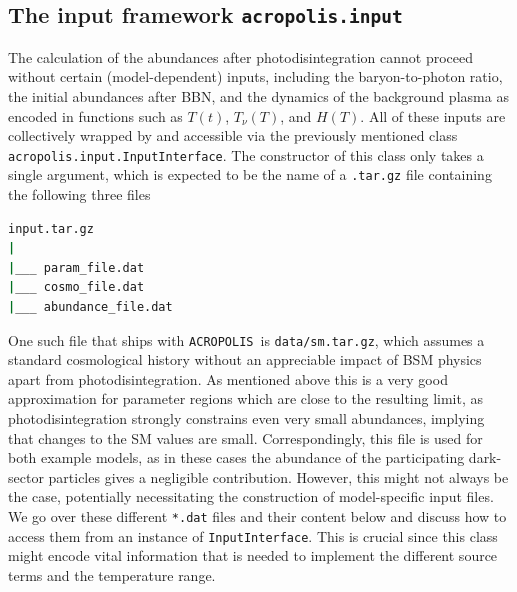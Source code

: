 \documentclass[11pt,a4paper]{article}
\newcommand{\acropolis}{\texttt{ACROPOLIS}~}
\begin{document}
\subsection{The input framework \texttt{acropolis.input}}
\label{sec:input}
The calculation of the abundances after photodisintegration cannot proceed without certain (model-dependent) inputs, including the baryon-to-photon ratio, the initial abundances after BBN, and the dynamics of the background plasma as encoded in functions such as $T(t)$, $T_\nu(T)$, and $H(T)$. All of these inputs are collectively wrapped by and accessible via the previously mentioned class \texttt{acropolis.input.InputInterface}. The constructor of this class only takes a single argument, which is expected to be the name of a \texttt{.tar.gz} file containing the following three files
\begin{lstlisting}[language=bash,backgroundcolor=\color{white}]
input.tar.gz
|
|___ param_file.dat
|___ cosmo_file.dat
|___ abundance_file.dat
\end{lstlisting}
One such file that ships with \acropolis is \texttt{data/sm.tar.gz}, which assumes a standard cosmological history without an appreciable impact of BSM physics apart from photodisintegration.
As mentioned above this is a very good approximation for parameter regions which are close to the resulting limit, as photodisintegration strongly constrains even very small abundances, implying that changes to the SM values are small. Correspondingly, this file is used for both example models, as in these cases the abundance of the participating dark-sector particles gives a negligible contribution.
However, this might not always be the case, potentially necessitating the construction of model-specific input files.
We go over these different \texttt{*.dat} files and their content below and discuss how to access them from an instance of \texttt{InputInterface}. This is crucial since this class might encode vital information that is needed to implement the different source terms and the temperature range.
\end{document}

